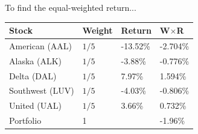To find the equal-weighted return...
\begin{center}
	{\color{blue}
	\begin{tabular}{l|lll}
		\textbf{Stock} & \textbf{W}eight & \textbf{R}eturn & \textbf{W}$\times$\textbf{R}\\ \hline
		American (AAL) & $1/5$ & -13.52\% & -2.704\% \\
		Alaska (ALK) & $1/5$ & -3.88\% & -0.776\% \\
		Delta (DAL) & $1/5$ & 7.97\% & 1.594\% \\
		Southwest (LUV) & $1/5$ & -4.03\% & -0.806\% \\
		United (UAL) & $1/5$ & 3.66\% & 0.732\% \\ \hline 
		Portfolio & 1 && -1.96\% \\\hline
	\end{tabular}
	}
\end{center}